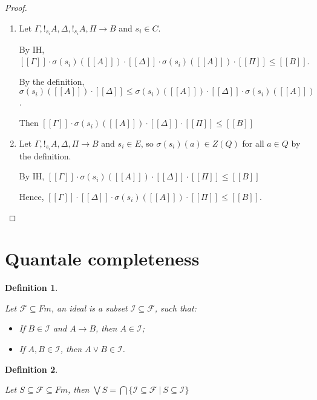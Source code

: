 \documentclass[a4paper]{article}
\newtheorem{defin}{Definition}
\begin{document}
\begin{proof}
\begin{enumerate}
\item Let $\Gamma, !_{s_i} A, \Delta, !_{s_i} A, \Pi \rightarrow B$ and $s_i \in C$.

By IH, $[\![\Gamma]\!] \cdot \sigma(s_i)([\![A]\!]) \cdot [\![\Delta]\!] \cdot \sigma(s_i)([\![A]\!]) \cdot [\![\Pi]\!] \leq [\![B]\!]$.

By the definition, $\sigma(s_i)([\![A]\!]) \cdot [\![\Delta]\!] \leq \sigma(s_i)([\![A]\!]) \cdot [\![\Delta]\!] \cdot \sigma(s_i)([\![A]\!])$.

Then $[\![\Gamma]\!] \cdot \sigma(s_i)([\![A]\!]) \cdot [\![\Delta]\!] \cdot [\![\Pi]\!] \leq [\![B]\!]$

\item Let $\Gamma, !_{s_i} A, \Delta, \Pi \rightarrow B$ and $s_i \in E$, so $\sigma(s_i)(a) \in Z(Q)$ for all $a \in Q$ by the definition.

By IH, $[\![\Gamma]\!] \cdot \sigma(s_i)([\![A]\!]) \cdot [\![\Delta]\!] \cdot [\![\Pi]\!] \leq [\![B]\!]$

Hence, $[\![\Gamma]\!] \cdot [\![\Delta]\!] \cdot \sigma(s_i)([\![A]\!]) \cdot [\![\Pi]\!] \leq [\![B]\!]$.

\end{enumerate}

\end{proof}

\section{Quantale completeness}

\begin{defin}
$ $

  Let $\mathcal{F} \subseteq Fm$, an ideal is a subset $\mathcal{I} \subseteq \mathcal{F}$, such that:

\begin{itemize}
  \item If $B \in \mathcal{I}$ and $A \rightarrow B$, then $A \in \mathcal{I}$;
  \item If $A, B \in \mathcal{I}$, then $A \lor B \in \mathcal{I}$.
\end{itemize}
\end{defin}

\begin{defin}
$ $

  Let $S \subseteq \mathcal{F} \subseteq Fm$,
  then $\bigvee S = \bigcap \{ \mathcal{I} \subseteq \mathcal{F} \: | \: S \subseteq \mathcal{I} \}$
\end{defin}
\end{document}
